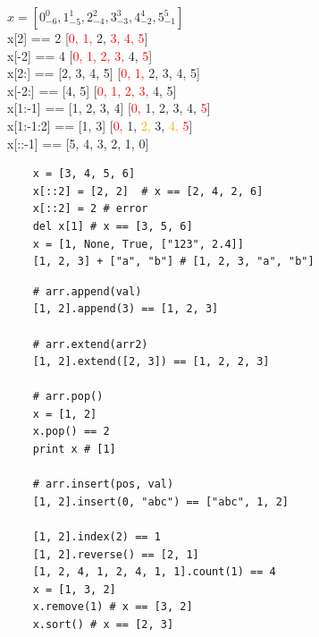 \documentclass{article}
\begin{document}
{
\Huge
\begin{flushleft}
$x = [0_{-6}^{0}, 1_{-5}^{1}, 2_{-4}^{2}, 3_{-3}^{3}, 4_{-2}^{4}, 5_{-1}^{5}]$ \\
\vspace{0.5cm}
x[2] == 2 \hspace{2cm}[\textcolor{red}{0, 1,} 2, \textcolor{red}{3, 4, 5}] \\
\vspace{0.5cm}
x[-2] == 4 \hspace{2cm}[\textcolor{red}{0, 1, 2, 3,} 4, \textcolor{red}{5}] \\
\vspace{0.5cm}
x[2:] == [2, 3, 4, 5] \hspace{2cm}[\textcolor{red}{0, 1, }2, 3, 4, 5] \\
\vspace{0.5cm}
x[-2:] == [4, 5] \hspace{2cm}[\textcolor{red}{0, 1, 2, 3,} 4, 5] \\
\vspace{0.5cm}
x[1:-1] == [1, 2, 3, 4] \hspace{2cm}[\textcolor{red}{0,} 1, 2, 3, 4, \textcolor{red}{5}] \\
\vspace{0.5cm}
x[1:-1:2] == [1, 3] \hspace{2cm}[\textcolor{red}{0,} 1, \textcolor{orange}{2,} 3, \textcolor{orange}{4,} \textcolor{red}{5}] \\
\vspace{0.5cm}
x[::-1] == [5, 4, 3, 2, 1, 0] \\
\end{flushleft}
}
\newpage

\vspace{15pt}
\begin{lstlisting}
	x = [3, 4, 5, 6]
	x[::2] = [2, 2]  # x == [2, 4, 2, 6]
	x[::2] = 2 # error
	del x[1] # x == [3, 5, 6]
	x = [1, None, True, ["123", 2.4]]
	[1, 2, 3] + ["a", "b"] # [1, 2, 3, "a", "b"]
\end{lstlisting}
\newpage

\Large{
\vspace{15pt}
\begin{lstlisting}
	# arr.append(val)
	[1, 2].append(3) == [1, 2, 3]

	# arr.extend(arr2)
	[1, 2].extend([2, 3]) == [1, 2, 2, 3]

	# arr.pop()
	x = [1, 2]
	x.pop() == 2
	print x # [1]

	# arr.insert(pos, val)
	[1, 2].insert(0, "abc") == ["abc", 1, 2]

	[1, 2].index(2) == 1
	[1, 2].reverse() == [2, 1]
	[1, 2, 4, 1, 2, 4, 1, 1].count(1) == 4
	x = [1, 3, 2]
	x.remove(1) # x == [3, 2]
	x.sort() # x == [2, 3]
\end{lstlisting}
}
\newpage
\end{document}
